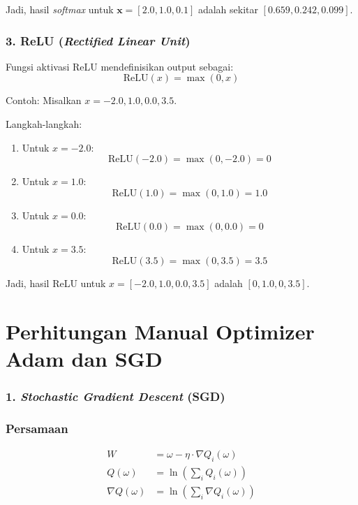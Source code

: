 Jadi, hasil \textit{softmax} untuk \(\mathbf{x} = [2.0, 1.0, 0.1]\) adalah sekitar \([0.659, 0.242, 0.099]\).

\subsection*{3. ReLU (\textit{Rectified Linear Unit})}
Fungsi aktivasi ReLU mendefinisikan output sebagai:
\[
\text{ReLU}(x) = \max(0, x)
\]

Contoh: Misalkan \( x = -2.0, 1.0, 0.0, 3.5 \).

Langkah-langkah:
\begin{enumerate}
    \item Untuk \( x = -2.0 \):
    \[
    \text{ReLU}(-2.0) = \max(0, -2.0) = 0
    \]

    \item Untuk \( x = 1.0 \):
    \[
    \text{ReLU}(1.0) = \max(0, 1.0) = 1.0
    \]

    \item Untuk \( x = 0.0 \):
    \[
    \text{ReLU}(0.0) = \max(0, 0.0) = 0
    \]

    \item Untuk \( x = 3.5 \):
    \[
    \text{ReLU}(3.5) = \max(0, 3.5) = 3.5
    \]
\end{enumerate}

Jadi, hasil ReLU untuk \( x = [-2.0, 1.0, 0.0, 3.5] \) adalah \([0, 1.0, 0, 3.5]\).



\chapter{Perhitungan Manual Optimizer Adam dan SGD}
\subsection*{1. \textit{Stochastic Gradient Descent} (SGD)}

\subsection*{Persamaan}
\begin{align}
    W & = \omega - \eta \cdot \nabla Q_i(\omega) \\
    Q(\omega) & = \ln\left(\sum_i Q_i(\omega)\right) \\
    \nabla Q(\omega) & = \ln\left(\sum_i \nabla Q_i(\omega)\right)
\end{align}



